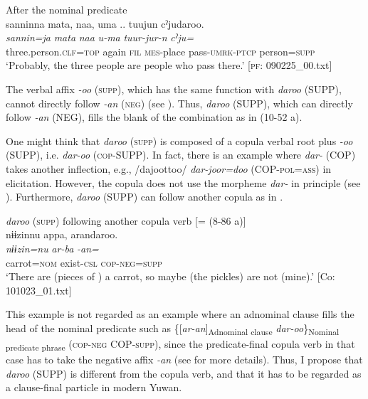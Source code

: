   \ex After the nominal predicate\\
      \glll    {\textbar}sannin{\textbar}na  mata,  naa,  uma ..  tuujun  cˀjudaroo.\\
    \textit{sannin=ja}  \textit{mata}  \textit{naa}  \textit{u-ma} {} \textit{tuur-jur-n} \textit{cˀju=}\\
    three.person.\textsc{clf}=\textsc{top}  again  \textsc{fil}  \textsc{mes}-place {} pass-\textsc{umrk}-\textsc{ptcp}  person=\textsc{supp}\\
    \glt     ‘Probably, the three people are people who pass there.’   [\textsc{pf}: 090225\_00.txt]
\z
\z

The verbal affix \textit{{}-oo} (\textsc{supp}), which has the same function with \textit{daroo} (SUPP), cannot directly follow \textit{{}-an} (\textsc{neg}) (see ). Thus, \textit{daroo} (SUPP), which can directly follow \textit{-an} (NEG), fills the blank of the combination as in (10-52 a).

  One might think that \textit{daroo} (\textsc{supp}) is composed of a copula verbal root plus \textit{{}-oo} (SUPP), i.e. \textit{dar-oo} (\textsc{cop}-SUPP). In fact, there is an example where \textit{dar-} (COP) takes another inflection, e.g., /dajoottoo/ \textit{dar-joor=doo} (COP-\textsc{pol}=\textsc{ass}) in elicitation. However, the copula does not use the morpheme \textit{dar-} in principle (see ). Furthermore, \textit{daroo} (SUPP) can follow another copula as in .

\ea\label{ex:10.53}   \textit{daroo} (\textsc{supp}) following another copula verb [= (8-86 a)]\\
      \glll    nɨɨzinnu  appa,  arandaroo.\\
    \textit{nɨɨzin=nu}  \textit{ar-ba}  \textit{-an=}\\
    carrot=\textsc{nom}  exist-\textsc{csl}  \textsc{cop}-\textsc{neg}=\textsc{supp}\\
\glt     ‘There are (pieces of ) a carrot, so maybe (the pickles) are not (mine).’  [Co: 101023\_01.txt]
\z

This example is not regarded as an example where an adnominal clause fills the head of the nominal predicate such as \{[\textit{ar-an}]\textsubscript{Adnominal clause} \textit{dar-oo}\}\textsubscript{Nominal predicate phrase} (\textsc{cop}-\textsc{neg} COP-\textsc{supp}), since the predicate-final copula verb in that case has to take the negative affix \textit{-an} (see  for more details). Thus, I propose that \textit{daroo} (SUPP) is different from the copula verb, and that it has to be regarded as a clause-final particle in modern Yuwan.

